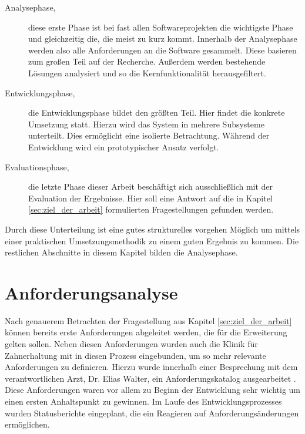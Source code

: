 \begin{description}
	\item[Analysephase,] diese erste Phase ist bei fast allen Softwareprojekten die
		wichtigste Phase und gleichzeitig die, die meist zu kurz kommt. Innerhalb der
		Analysephase werden also alle Anforderungen an die Software gesammelt. Diese
		basieren zum großen Teil auf der Recherche. Außerdem werden bestehende Lösungen
		analysiert und so die Kernfunktionalität herausgefiltert.

	\item[Entwicklungsphase,] die Entwicklungsphase bildet den größten Teil. Hier
		findet die konkrete Umsetzung statt. Hierzu wird das System in mehrere Subsysteme
		unterteilt. Dies ermöglicht eine isolierte Betrachtung. Während der Entwicklung
		wird ein prototypischer Ansatz verfolgt.

	\item[Evaluationsphase,] die letzte Phase dieser Arbeit beschäftigt sich ausschließlich
		mit der Evaluation der Ergebnisse. Hier soll eine Antwort auf die in Kapitel
		\ref{sec:ziel_der_arbeit} formulierten Fragestellungen gefunden werden.
\end{description}

Durch diese Unterteilung ist eine gutes strukturelles vorgehen Möglich um mittels
einer praktischen Umsetzungsmethodik zu einem guten Ergebnis zu kommen. Die
restlichen Abschnitte in diesem Kapitel bilden die Analysephase.

\section{Anforderungsanalyse}
\label{sec:anforderungsanalyse} Nach genauerem Betrachten der Fragestellung aus
Kapitel \ref{sec:ziel_der_arbeit} können bereits erste Anforderungen abgeleitet
werden, die für die Erweiterung gelten sollen. Neben diesen Anforderungen wurden
auch die Klinik für Zahnerhaltung mit in diesen Prozess eingebunden, um so mehr relevante
Anforderungen zu definieren. Hierzu wurde innerhalb einer Besprechung mit dem
verantwortlichen Arzt, Dr. Elias Walter, ein Anforderungskatalog ausgearbeitet \citep[vgl.][]{walter2025}.
Diese Anforderungen waren vor allem zu Beginn der Entwicklung sehr wichtig um einen
ersten Anhaltspunkt zu gewinnen. Im Laufe des Entwicklungsprozesses wurden
Statusberichte eingeplant, die ein Reagieren auf Anforderungsänderungen ermöglichen.

